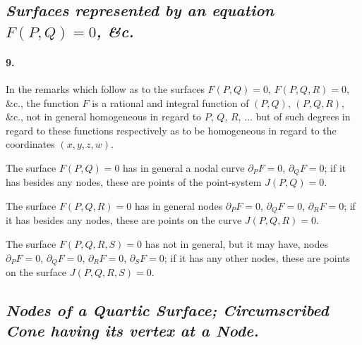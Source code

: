 \documentclass[11pt,a4paper]{article}
\begin{document}
\subsection*{\textit{Surfaces represented by an equation $F(P, Q) = 0$, \&c.}}

\paragraph{9.}
In the remarks which follow as to the surfaces $F(P, Q) = 0$, $F(P, Q, R) = 0$, \&c., the
function $F$ is a rational and integral function of $(P, Q)$, $(P, Q, R)$, \&c., not in
general homogeneous in regard to $P$, $Q$, $R$, $\ldots$ but of such degrees in regard to
these functions respectively as to be homogeneous in regard to the coordinates
$(x, y, z, w)$.

\medskip

The surface $F(P, Q) = 0$ has in general a nodal curve $\partial_P F = 0$, $\partial_Q F = 0$;
if it has besides any nodes, these are points of the point-system $J(P, Q) = 0$.

\medskip

The surface $F(P, Q, R) = 0$ has in general nodes $\partial_P F = 0$, $\partial_Q F = 0$,
$\partial_R F = 0$; if it has besides any nodes, these are points on the curve
$J(P, Q, R) = 0$.

\medskip

The surface $F(P, Q, R, S) = 0$ has not in general, but it may have, nodes $\partial_P F = 0$,
$\partial_Q F = 0$, $\partial_R F = 0$, $\partial_S F = 0$; if it has any other nodes,
these are points on the surface $J(P, Q, R, S) = 0$.

\subsection*{\textit{Nodes of a Quartic Surface; Circumscribed Cone having its vertex at a Node.}}
\end{document}
